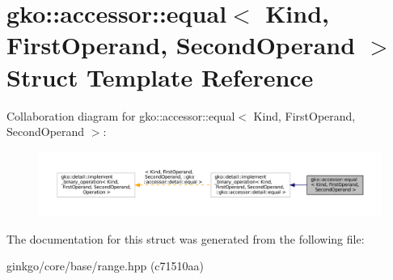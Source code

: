\hypertarget{structgko_1_1accessor_1_1equal}{}\section{gko\+:\+:accessor\+:\+:equal$<$ Kind, First\+Operand, Second\+Operand $>$ Struct Template Reference}
\label{structgko_1_1accessor_1_1equal}


Collaboration diagram for gko\+:\+:accessor\+:\+:equal$<$ Kind, First\+Operand, Second\+Operand $>$\+:
\nopagebreak
\begin{figure}[H]
\begin{center}
\leavevmode
\includegraphics[width=350pt]{structgko_1_1accessor_1_1equal__coll__graph}
\end{center}
\end{figure}


The documentation for this struct was generated from the following file\+:\begin{DoxyCompactItemize}
\item 
ginkgo/core/base/range.\+hpp (c71510aa)\end{DoxyCompactItemize}
